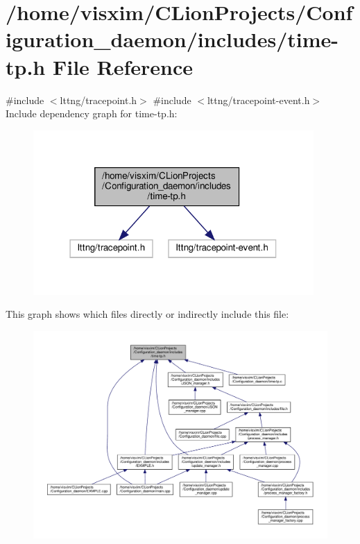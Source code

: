 \hypertarget{time-tp_8h}{}\section{/home/visxim/\+C\+Lion\+Projects/\+Configuration\+\_\+daemon/includes/time-\/tp.h File Reference}
\label{time-tp_8h}
{\ttfamily \#include $<$lttng/tracepoint.\+h$>$}\newline
{\ttfamily \#include $<$lttng/tracepoint-\/event.\+h$>$}\newline
Include dependency graph for time-\/tp.h\+:
\nopagebreak
\begin{figure}[H]
\begin{center}
\leavevmode
\includegraphics[width=303pt]{time-tp_8h__incl}
\end{center}
\end{figure}
This graph shows which files directly or indirectly include this file\+:
\nopagebreak
\begin{figure}[H]
\begin{center}
\leavevmode
\includegraphics[width=350pt]{time-tp_8h__dep__incl}
\end{center}
\end{figure}
